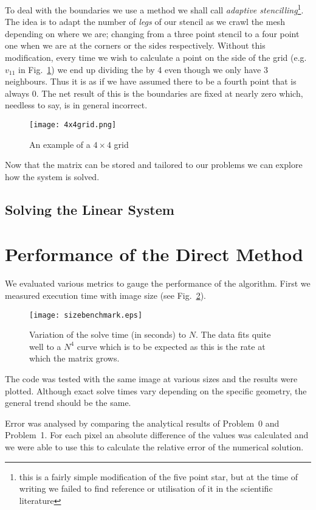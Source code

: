 \documentclass[a4paper]{article}
\begin{document}
To deal with the boundaries we use a method we shall call \emph{adaptive
stencilling}\footnote{this is a fairly simple modification of the five point
star, but at the time of writing we failed to find reference or utilisation of
it in the scientific literature}. The idea is to adapt the number of
\emph{legs} of our stencil as we crawl the mesh depending on where we are;
changing from a three point stencil to a four point one when we are at the
corners or the sides respectively. Without this modification, every time we
wish to calculate a point on the side of the grid (e.g. $v_{11}$ in
Fig.~\ref{gridFig}) we end up dividing the by 4 even though we only have 3
neighbours. Thus it is as if we have assumed there to be a fourth point that is
always 0. The net result of this is the boundaries are fixed at nearly zero
which, needless to say, is in general incorrect.
\begin{figure}
\centering
\texttt{[image: 4x4grid.png]}
\caption{An example of a $4 \times 4$ grid}
\label{gridFig}
\end{figure}

Now that the matrix can be stored and tailored to our problems we can explore
how the system is solved.

\subsection{Solving the Linear System}

\section{Performance of the Direct Method}
We evaluated various metrics to gauge the performance of the algorithm. First
we measured execution time with image size (see Fig.~\ref{sizetestFig}).
\begin{figure}
	\centering
	\texttt{[image: sizebenchmark.eps]}
	\caption{Variation of the solve time (in seconds) to $N$. The data fits
	quite well to a $N^4$ curve which is to be expected as this is the rate
	at which the matrix grows.}
	\label{sizetestFig}
\end{figure}
The code was tested with the same image at various sizes and the results were
plotted. Although exact solve times vary depending on the specific geometry,
the general trend should be the same.

Error was analysed by comparing the analytical results of Problem~0 and
Problem~1. For each pixel an absolute difference of the values was calculated
and we were able to use this to calculate the relative error of the numerical
solution.
\end{document}
